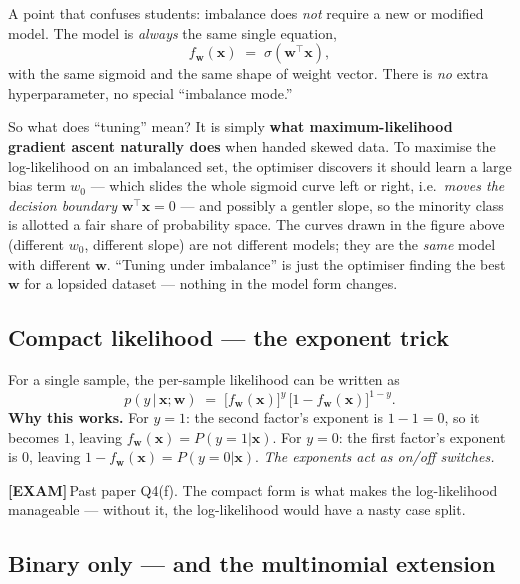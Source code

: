 \documentclass[11pt, a4paper]{article}
\newcommand{\examflag}{\textcolor{tipBd}{\textbf{[EXAM]}}\,}
\begin{document}
\begin{notebox}
A point that confuses students: imbalance does \emph{not} require a new or modified model. The model is \emph{always} the same single equation,
\[
f_\mathbf{w}(\mathbf{x}) \;=\; \sigma(\mathbf{w}^\top\mathbf{x}),
\]
with the same sigmoid and the same shape of weight vector. There is \emph{no} extra hyperparameter, no special ``imbalance mode.''

So what does ``tuning'' mean? It is simply \textbf{what maximum-likelihood gradient ascent naturally does} when handed skewed data. To maximise the log-likelihood on an imbalanced set, the optimiser discovers it should learn a large bias term $w_0$ --- which slides the whole sigmoid curve left or right, i.e.\ \emph{moves the decision boundary} $\mathbf{w}^\top\mathbf{x}=0$ --- and possibly a gentler slope, so the minority class is allotted a fair share of probability space. The curves drawn in the figure above (different $w_0$, different slope) are not different models; they are the \emph{same} model with different $\mathbf{w}$. ``Tuning under imbalance'' is just the optimiser finding the best $\mathbf{w}$ for a lopsided dataset --- nothing in the model form changes.
\end{notebox}

\subsection{Compact likelihood — the exponent trick}

For a single sample, the per-sample likelihood can be written as
\[
\boxed{\;p(y\,|\,\mathbf{x};\mathbf{w}) \;=\; \big[f_\mathbf{w}(\mathbf{x})\big]^y\,\big[1-f_\mathbf{w}(\mathbf{x})\big]^{1-y}.\;}
\]
\textbf{Why this works.} For $y=1$: the second factor's exponent is $1-1=0$, so it becomes $1$, leaving $f_\mathbf{w}(\mathbf{x}) = P(y=1|\mathbf{x})$. For $y=0$: the first factor's exponent is $0$, leaving $1-f_\mathbf{w}(\mathbf{x}) = P(y=0|\mathbf{x})$. \emph{The exponents act as on/off switches.}

\examflag{}Past paper Q4(f). The compact form is what makes the log-likelihood manageable — without it, the log-likelihood would have a nasty case split.

\subsection{Binary only --- and the multinomial extension}
\end{document}
